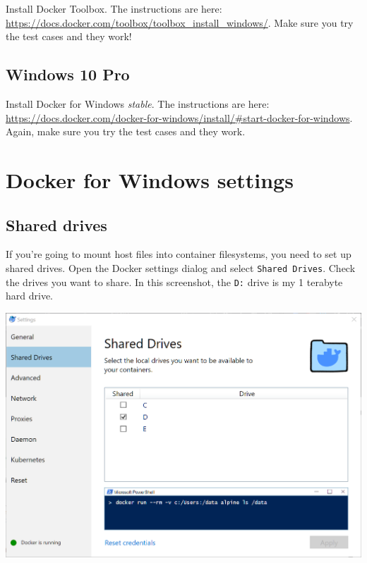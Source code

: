 \documentclass[]{book}
\theoremstyle{definition}
\theoremstyle{definition}
\theoremstyle{definition}
\theoremstyle{remark}
\begin{document}
Install Docker Toolbox. The instructions are here:
\url{https://docs.docker.com/toolbox/toolbox_install_windows/}. Make
sure you try the test cases and they work!

\hypertarget{windows-10-pro}{%
\subsection{Windows 10 Pro}\label{windows-10-pro}}

Install Docker for Windows \emph{stable}. The instructions are here:
\url{https://docs.docker.com/docker-for-windows/install/\#start-docker-for-windows}.
Again, make sure you try the test cases and they work.

\hypertarget{docker-for-windows-settings}{%
\section{Docker for Windows
settings}\label{docker-for-windows-settings}}

\hypertarget{shared-drives}{%
\subsection{Shared drives}\label{shared-drives}}

If you're going to mount host files into container filesystems, you need
to set up shared drives. Open the Docker settings dialog and select
\texttt{Shared\ Drives}. Check the drives you want to share. In this
screenshot, the \texttt{D:} drive is my 1 terabyte hard drive.

\begin{center}\includegraphics[width=0.9\linewidth]{screenshots/2018-08-26_15_16_51-Shared_Drives} \end{center}
\end{document}
